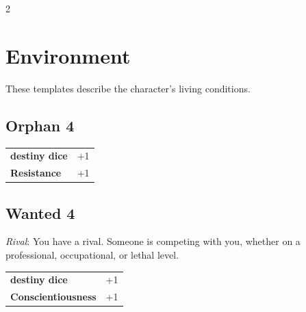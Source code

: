 \begin{multicols}{2}
\begin{tcolorbox}
\vspace{3mm}



\end{tcolorbox}

\section{Environment}

These templates describe the character's living conditions.

\begin{tcolorbox}
    \subsection*{Orphan \hfill \small{4 }}
    \tcblower




\begin{tabular}{@{}ll@{}}
    \textbf{destiny dice} & +1\\
    \textbf{Resistance} & +1\\
\end{tabular}


\end{tcolorbox}

\begin{tcolorbox}
    \subsection*{Wanted \hfill \small{4 }}
    \tcblower
\textit{Rival}: You have a rival. Someone is competing with you, whether on a professional, occupational, or lethal level.


\vspace{3mm}

\begin{tabular}{@{}ll@{}}
    \textbf{destiny dice} & +1\\
    \textbf{Conscientiousness} & +1\\
\end{tabular}



\end{tcolorbox}
\end{multicols}
